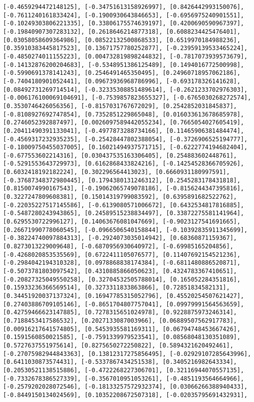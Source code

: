 \documentclass[11pt]{article}
\begin{document}
\begin{Verbatim}[commandchars=\\\{\}]
[-0.4659294472148125], [-0.34751613158926997], [0.8426442993150076], [-0.7611240161833424], [-0.1900930643846653], [-0.6956975240901551], [-0.10249303806221335], [0.33806175574639197], [0.4200690590967397], [-0.19840907307283132], [0.2618646214877318], [0.6088234425476401], [0.03058058609364986], [0.08522132500868533], [0.6519970184988236], [0.35910383445817523], [0.13671757780252877], [-0.23959139533465224], [-0.4850274011155223], [0.004732819898244832], [-0.7817073939573679], [-0.14132876200204683], [-0.5348951386125489], [0.1494016772500998], [-0.5990691378141243], [0.2546491465350495], [0.24960718957062186], [-0.7404180901052441], [0.09673936968786996], [-0.693178326141628], [0.08492731269714514], [-0.32335308851489614], [-0.2621233702976303], [-0.006176100069104691], [-0.7539857823655327], [-0.6765030268272574], [0.3530746426056356], [-0.8157031767672029], [0.2542852031845837], [-0.8108927692747854], [0.7352851229865048], [0.016033613678685978], [0.2746052392887497], [0.0026097589442055234], [0.7665054027605419], [0.20411490391133041], [-0.4977873288734166], [0.11465906381484474], [-0.4569317232935235], [-0.25428447802388054], [-0.3726906525194777], [-0.18009750455037005], [0.16021494937571715], [-0.6222774194682404], [-0.677553602214316], [0.030437535163306405], [0.254883602448761], [-0.5291553643729973], [0.6162868433824216], [-0.14254528366705926], [0.6032418192182224], [0.302296564413023], [0.6660931180997591], [-0.37687348372980445], [0.1794380131246312], [0.2545283178431818], [0.8150074990167543], [-0.19062065749078186], [-0.8156244347395816], [0.3227247809608381], [0.15014319799083592], [0.6395891682522762], [-0.22035227517145586], [-0.6139080571006672], [0.6432534817816885], [-0.5487280243943865], [0.24589515238834497], [0.33872275581141964], [0.6295530722996127], [0.14063676081047669], [-0.9023127541691665], [0.26671990778060545], [-0.0966506540158844], [-0.10392835911345699], [-0.38224740097884313], [-0.2924073035014942], [0.68360871159367], [0.8273013229009648], [-0.6870956930640972], [-0.69985165204856], [-0.4268020853535569], [0.6722411105076577], [0.11407692154521236], [-0.2984042194310328], [0.0978868838174384], [-0.6811480886520871], [-0.5073781803097542], [0.4310885866050623], [0.4324783367410651], [-0.20827325049550258], [0.32704532505788014], [0.165052284351816], [0.15933236366569514], [0.3273311833863866], [0.72851834582131], [0.34451920037137324], [0.16947785315052796], [0.45520254507621427], [0.27403886709105146], [-0.8651704807757041], [0.09979991564563659], [0.42759466623147885], [0.7278315651024978], [0.9228875973246314], [0.7188453417586532], [0.2027133087003966], [0.06889507562917783], [0.00916217641574805], [0.5453935581169311], [0.06794748453667426], [0.1591560850021585], [-0.7591339979523541], [0.08568048130351089], [0.5727637551975614], [0.8275650272250822], [0.5894321620492461], [-0.27075982944843363], [0.13812317275856495], [-0.02929107285643996], [0.6411030873574431], [-0.5337867434251538], [0.3405216982643334], [0.20530521138515886], [-0.4722268227306701], [0.32116944070557135], [-0.7332678386527339], [-0.3567010951053261], [-0.4851193564664966], [-0.2579202028072546], [-0.18133257572932374], [0.03066266388940433], [-0.8449150134024569], [0.10352208672507318], [-0.02035795691432931], 
\end{Verbatim}
\end{document}
